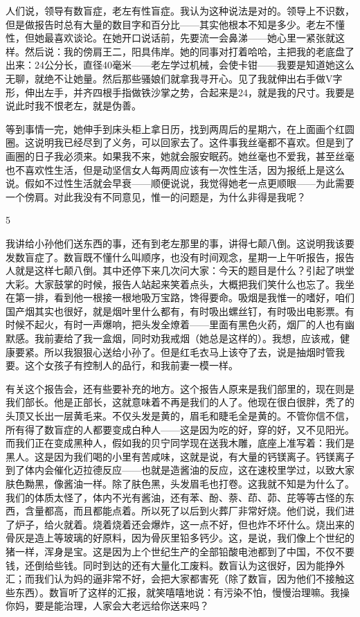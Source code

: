 人们说，领导有数盲症，老左有性盲症。我认为这种说法是对的。领导上不识数，但是做报告时总有大量的数目字和百分比——其实他根本不知是多少。老左不懂性，但她最喜欢谈论。在她开口说话前，先要流一会鼻涕——她心里一紧张就这样。然后说：我的傍肩王二，阳具伟岸。她的同事对打着哈哈，主把我的老底盘了出来：24公分长，直径40毫米——老左学过机械，会使卡钳——我要是知道她这么无聊，就绝不让她量。然后那些骚娘们就拿我寻开心。见了我就伸出右手做V字形，伸出左手，并齐四根手指做铁沙掌之势，合起来是24，就是我的尺寸。我要是说此时我不恨老左，就是伪善。 



等到事情一完，她伸手到床头柜上拿日历，找到两周后的星期六，在上面画个红圆圈。这说明我已经尽到了义务，可以回家去了。这件事我丝毫都不喜欢。但是到了画圈的日子我必须来。如果我不来，她就会服安眠药。她丝毫也不爱我，甚至丝毫也不喜欢性生活，但是动坚信女人每两周应该有一次性生活，因为报纸上是这么说。假如不过性生活就会早衰——顺便说说，我觉得她老一点更顺眼——为此需要一个傍肩。对此我没有不同意见，惟一的问题是，为什么非得是我呢？ 



5 

我讲给小孙他们送东西的事，还有到老左那里的事，讲得七颠八倒。这说明我该要发数盲症了。数盲既不懂什么叫顺序，也没有时间观念，星期一上午听报告，报告人就是这样七颠八倒。其中还停下来几次问大家：今天的题目是什么？引起了哄堂大彩。大家鼓掌的时候，报告人站起来笑着点头，大概把我们笑什么也忘了。我坐在第一排，看到他一根接一根地吸万宝路，馋得要命。吸烟是我惟一的嗜好，咱们国产烟其实也很好，就是烟叶里什么都有，有时吸出螺丝钉，有时吸出电影票。有时候不起火，有时一声爆响，把头发全燎着——里面有黑色火药，烟厂的人也有幽默感。我前妻给了我一盒烟，同时劝我戒烟（她总是这样的）。我想，应该戒，健康要紧。所以我狠狠心送给小孙了。但是红毛衣马上该夺了去，说是抽烟时管我要。这个女孩子有控制人的品行，和我前妻一模一样。 

有关这个报告会，还有些要补充的地方。这个报告人原来是我们部里的，现在则是我们部长。他是正部长，这就意味着不再是我们的人了。他现在很白很胖，秃了的头顶又长出一层黄毛来。不仅头发是黄的，眉毛和睫毛全是黄的。不管你信不信，所有得了数盲症的人都要变成白种人——这是因为吃的好，穿的好，又不见阳光。而我们正在变成黑种人，假如我的贝宁同学现在送我木雕，底座上准写着：我们是黑人。这是因为我们喝的小里有苦咸味，这就是说，有大量的钙镁离子。钙镁离子到了体内会催化迈拉德反应——也就是造酱油的反应，这在速校里学过，以致大家肤色黝黑，像酱油一样。除了肤色黑，头发眉毛也打卷。这我就不知是为什么了。我们的体质太怪了，体内不光有酱油，还有苯、酚、萘、茚、茆、芘等等古怪的东西，含量都高，而且都能点着。所以死了以后到火葬厂非常好烧。他们说，我们进了炉子，给火就着。烧着烧着还会爆炸，这一点不好，但也炸不坏什么。烧出来的骨灰是造上等玻璃的好原料，因为骨灰里铅多钙少。这，是说，我们像上个世纪的猪一样，浑身是宝。这是因为上个世纪生产的全部铅酸电池都到了中国，不仅不要钱，还倒给些钱。同时到达的还有大量化工废料。数盲认为这很好，因为能挣外汇；而我们认为妈的逼非常不好，会把大家都害死（除了数盲，因为他们不接触这些东西）。数盲听了这样的汇报，就笑嘻嘻地说：有污染不怕，慢慢治理嘛。我操你妈，要是能治理，人家会大老远给你送来吗？ 

